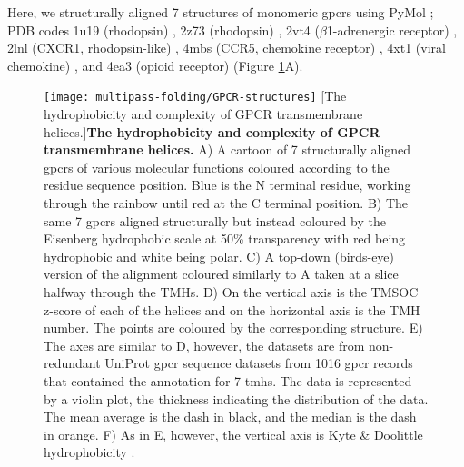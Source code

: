 Here, we structurally aligned 7 structures of monomeric \gls{gpcr}s using PyMol \cite{DeLano2002};
PDB codes 1u19 (rhodopsin) \cite{Okada2004}, 2z73 (rhodopsin) \cite{Murakami2008}, 2vt4 ($\beta$1-adrenergic receptor) \cite{Warne2008}, 2lnl (CXCR1, rhodopsin-like) \cite{Park2012}, 4mbs (CCR5, chemokine receptor) \cite{Tan2013}, 4xt1 (viral chemokine) \cite{Burg2015}, and 4ea3 (opioid receptor) \cite{Thompson2012} (Figure \ref{fig:GPCR-structures}A).

\begin{figure}[!ht]
\centering
\texttt{[image: multipass-folding/GPCR-structures]}
		[The hydrophobicity and complexity of GPCR transmembrane helices.]{\textbf{The hydrophobicity and complexity of GPCR transmembrane helices.}
    A) A cartoon of 7 structurally aligned \gls{gpcr}s of various molecular functions coloured according to the residue sequence position.
    Blue is the N terminal residue, working through the rainbow until red at the C terminal position.
    B) The same 7 \gls{gpcr}s aligned structurally but instead coloured by the Eisenberg hydrophobic scale \cite{Eisenberg1984} at 50\% transparency with red being hydrophobic and white being polar.
    C) A top\--down (birds\--eye) version of the alignment coloured similarly to A taken at a slice halfway through the TMHs.
    D) On the vertical axis is the TMSOC z\--score of each of the helices and on the horizontal axis is the TMH number.
    The points are coloured by the corresponding structure.
    E) The axes are similar to D, however, the datasets are from non-redundant UniProt \gls{gpcr} sequence datasets from 1016 \gls{gpcr} records that contained the annotation for 7 \gls{tmh}s.
    The data is represented by a violin plot, the thickness indicating the distribution of the data.
    The mean average is the dash in black, and the median is the dash in orange.
    F) As in E, however, the vertical axis is Kyte \& Doolittle hydrophobicity \cite{Kyte1982}.}

\label{fig:GPCR-structures}
\end{figure}

